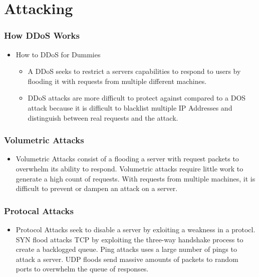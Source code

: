 \documentclass{beamer}
\begin{document}
\section{Attacking}

\begin{frame}
    \frametitle{How DDoS Works}
    \begin{itemize}
        \item How to DDoS for Dummies
            \begin{itemize}
                \item A DDoS seeks to restrict a servers capabilities to respond to users by flooding it with requests from multiple different machines.
                \item DDoS attacks are more difficult to protect against compared to a DOS attack because it is difficult to blacklist multiple IP Addresses and distinguish between real requests and the attack.
            \end{itemize}
    \end{itemize}
\end{frame}

\begin{frame}
    \frametitle{Volumetric Attacks}
        \begin{itemize}
            \item Volumetric Attacks consist of a flooding a server with request packets to overwhelm its ability to respond. Volumetric attacks require little work to generate a high count of requests. With requests from multiple machines, it is difficult to prevent or dampen an attack on a server.
    \end{itemize}
\end{frame}
\begin{frame}
    \frametitle{Protocal Attacks}
     \begin{itemize}
            \item <+->Protocol Attacks seek to disable a server by exloiting a weakness in a protocl. SYN flood attacks TCP by exploiting the three-way handshake process to create a backlogged queue. Ping attacks uses a large number of pings to attack a server. UDP floods send massive amounts of packets to random ports to overwhelm the queue of responses.
        \end{itemize}
\end{frame}
\end{document}
